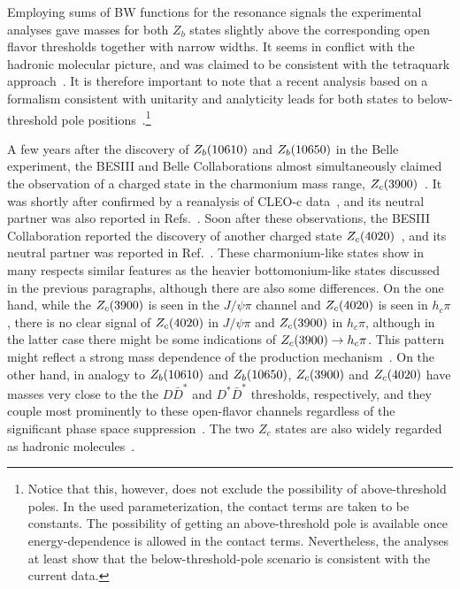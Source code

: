 Employing sums of BW functions for the resonance signals the experimental
analyses gave masses for both $Z_b$ states slightly above the corresponding open
flavor thresholds together with narrow widths. It seems in conflict with the
hadronic molecular picture, and was claimed to be consistent with the tetraquark
approach~\cite{Esposito:2016itg}. It is therefore important to note that a
recent analysis based on a formalism consistent with unitarity and analyticity
leads for both states to below-threshold pole
positions~\cite{Hanhart:2015cua,Guo:2016bjq}.\footnote{Notice that this,
however, does not exclude the possibility of above-threshold poles. In the used
parameterization, the contact terms are taken to be constants.
The possibility of getting an above-threshold pole is available once
energy-dependence is allowed in the contact terms. Nevertheless, the analyses at
least show that the below-threshold-pole scenario is consistent with the current
data.}

A few years after the discovery of $Z_b(10610)$ and $Z_b(10650)$ in the Belle experiment, the
BESIII and Belle Collaborations almost simultaneously claimed the observation of
a charged state in the charmonium mass range,
$Z_c(3900)$~\cite{Ablikim:2013mio,Liu:2013dau}. It was shortly after confirmed by a
reanalysis of CLEO-c data~\cite{Xiao:2013iha}, and its neutral partner was also
reported in Refs.~\cite{Xiao:2013iha,Ablikim:2015tbp}. Soon after these
observations, the BESIII Collaboration reported the discovery of another charged
state $Z_c(4020)$~\cite{Ablikim:2013wzq}, and its neutral partner was reported in
Ref.~\cite{Ablikim:2014dxl}.
These charmonium-like states show in many respects similar features as the
heavier bottomonium-like states discussed in the previous paragraphs, although
there are also some differences. On the one hand, while the $Z_c(3900)$ is seen in the
$J/\psi \pi$ channel and $Z_c(4020)$ is seen in $h_c\pi$, there is no clear signal of
$Z_c(4020)$ in $J/\psi\pi$ and $Z_c(3900)$ in $h_c\pi$, although in the latter case there
might be some indications of $Z_c(3900)\to h_c\pi$. This pattern might reflect a
strong mass dependence of the production mechanism~\cite{Wang:2013hga}.
On the other hand, in analogy to $Z_b(10610)$ and $Z_b(10650)$, $Z_c(3900)$ and $Z_c(4020)$ have masses
very close to the the $D\bar D^*$ and $D^*\bar D^*$ thresholds, respectively,
and they couple most prominently to these open-flavor channels regardless
of the significant phase space
suppression~\cite{Ablikim:2013xfr,Ablikim:2013emm,Ablikim:2015gda,
Ablikim:2015vvn}. The two $Z_c$ states are also widely regarded as hadronic
molecules~\cite{Wang:2013cya,Guo:2013sya,Voloshin:2013dpa,Cui:2013yva,
Wilbring:2013cha,Li:2013xia,
Zhang:2013aoa,Dong:2013iqa,Ke:2013gia,He:2013nwa,
Karliner:2015ina,Chen:2015ata,Gong:2016hlt}.

